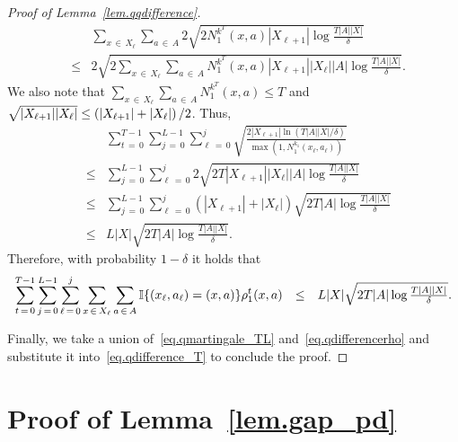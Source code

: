 \documentclass[12pt, final]{l4dc2023}
\begin{document}
\begin{proof}[Proof of Lemma~\ref{lem.qqdifference}]
\[\begin{array}{rcl}
	&& \!\!\!\! \!\!\!\! \!\!
	\displaystyle \sum_{x\,\in\,X_\ell}\sum_{a\,\in\,A}2 \sqrt{ 2 N_1^{k^T}(x,a) |X_{\ell+1}| \log\frac{T|A||X|}{\delta} }
	\\[0.2cm]
	&\leq&
	\displaystyle2 \sqrt{ 2\sum_{x\,\in\,X_\ell}\sum_{a\,\in\,A}N_1^{k^T}(x,a) |X_{\ell+1}||X_\ell||A| \log\frac{T|A||X|}{\delta} }.
	\end{array}
	\]
	We also note that $\sum_{x\,\in\,X_\ell}\sum_{a\,\in\,A}N_1^{k^T}(x,a)\leq T$ and $\sqrt{|X_{\ell+1}||X_\ell|}\leq\left(|X_{\ell+1}|+|X_\ell|\right)/2$. Thus,
	\[
	\begin{array}{rcl}
	&& \!\!\!\! \!\!\!\! \!\!
	\displaystyle \sum_{t\,=\,0}^{T-1} \sum_{j\,=\,0}^{L-1} \sum_{\ell\,=\,0}^{j} \sqrt{ \frac{ 2|X_{\ell+1}| \ln(T|A||X|/\delta)}{\max (1, N_1^{k_1}(x_\ell,a_\ell)) } } 
	\\[0.2cm]
	&\leq& \displaystyle \sum_{j\,=\,0}^{L-1} \sum_{\ell\,=\,0}^{j}2 \sqrt{ 2 T |X_{\ell+1}||X_\ell||A| \log\frac{T|A||X|}{\delta}}
	\\[0.2cm]
	&\leq& \displaystyle \sum_{j\,=\,0}^{L-1} \sum_{\ell\,=\,0}^{j}( |X_{\ell+1}|+|X_\ell|) \sqrt{ 2 T|A| \log\frac{T|A||X|}{\delta}}
	\\[0.2cm]
	&\leq& L|X| \sqrt{ 2 T|A|\log\frac{T|A||X|}{\delta}}.
	\end{array}
	\]
	Therefore, with probability $1-\delta$ it holds that
	\begin{equation}\label{eq.qdifferencerho}
	\begin{array}{rcl}
	\displaystyle
	\sum_{t\,=\,0}^{T-1} \sum_{j\,=\,0}^{L-1} \sum_{\ell\,=\,0}^{j}\sum_{x\,\in\,X_\ell}\sum_{a\,\in\,A} \mathbb{I}{\{{(x_\ell,a_\ell)=(x,a)}\}}\rho_1^t(x,a) 
	&\leq&L|X| \sqrt{ 2 T|A| \log\frac{T|A||X|}{\delta} }.
	\end{array}
	\end{equation}
	
	Finally, we take a union of~\eqref{eq.qmartingale_TL} and~\eqref{eq.qdifferencerho} and substitute it into~\eqref{eq.qdifference_T} to conclude the proof.
	
\end{proof}

\section{Proof of Lemma~\ref{lem.gap_pd}}
\label{ap.gap_pd}
\end{document}
